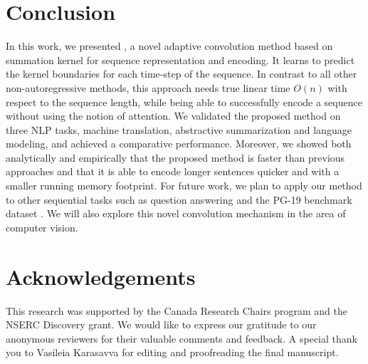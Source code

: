 \documentclass{article}
\begin{document}
\section{Conclusion}
In this work, we presented \talkfullsabbr{}, a novel adaptive convolution method based on summation kernel for sequence representation and encoding. It learns to predict the kernel boundaries for each time-step of the sequence. In contrast to all other non-autoregressive methods, this approach needs true linear time $O(n)$ with respect to the sequence length, while being able to successfully encode a sequence without using the notion of attention. We validated the proposed method on three NLP tasks, machine translation, abstractive summarization and language modeling, and achieved a comparative performance. Moreover, we showed both analytically and empirically that the proposed method is faster than previous approaches and that it is able to encode longer sentences quicker and with a smaller running memory footprint. For future work, we plan to apply our method to other sequential tasks such as question answering and the PG-19 benchmark dataset \cite{Rae2020Compressive}. We will also explore this novel convolution mechanism in the area of computer vision.

\section*{Acknowledgements}
This research was supported by the Canada Research Chairs program and the NSERC Discovery grant. We would like to express our gratitude to our anonymous reviewers for their valuable comments and feedback. A special thank you to Vasileia Karasavva for editing and proofreading the final manuscript.



\end{document}
